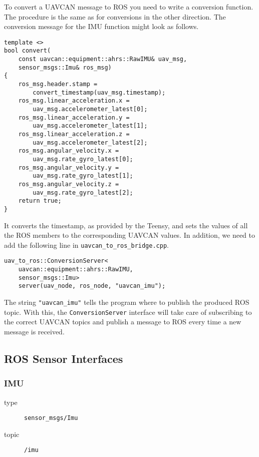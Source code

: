 \documentclass[9pt,technote]{IEEEtran} %
\begin{document}
To convert a UAVCAN message to ROS you need to write a conversion
function. The procedure is the same as for conversions in the
other direction. The conversion message for the IMU function
might look as follows.
\begin{scriptsize}
\begin{verbatim}
template <>
bool convert(
    const uavcan::equipment::ahrs::RawIMU& uav_msg,
    sensor_msgs::Imu& ros_msg)
{
    ros_msg.header.stamp =
        convert_timestamp(uav_msg.timestamp);
    ros_msg.linear_acceleration.x =
        uav_msg.accelerometer_latest[0];
    ros_msg.linear_acceleration.y =
        uav_msg.accelerometer_latest[1];
    ros_msg.linear_acceleration.z =
        uav_msg.accelerometer_latest[2];
    ros_msg.angular_velocity.x =
        uav_msg.rate_gyro_latest[0];
    ros_msg.angular_velocity.y =
        uav_msg.rate_gyro_latest[1];
    ros_msg.angular_velocity.z =
        uav_msg.rate_gyro_latest[2];
    return true;
}
\end{verbatim}
\end{scriptsize}
It converts the timestamp, as provided by the Teensy,
and sets the values of all the ROS members to the corresponding
UAVCAN values. In addition, we need to add the following
line in \texttt{uavcan\_to\_ros\_bridge.cpp}.
\begin{scriptsize}
\begin{verbatim}
uav_to_ros::ConversionServer<
    uavcan::equipment::ahrs::RawIMU,
    sensor_msgs::Imu>
    server(uav_node, ros_node, "uavcan_imu");
\end{verbatim}
\end{scriptsize}
The string \texttt{"uavcan\_imu"} tells the program where to
publish the produced ROS topic. With this, the \texttt{ConversionServer}
interface will take care of subscribing to the correct UAVCAN topics
and publish a message to ROS every time a new message is received.

\subsection{ROS Sensor Interfaces}


\subsubsection{IMU}

\begin{description}
\item[type] \texttt{sensor\_msgs/Imu}
\item[topic] \texttt{/imu}
\end{description}
\end{document}
